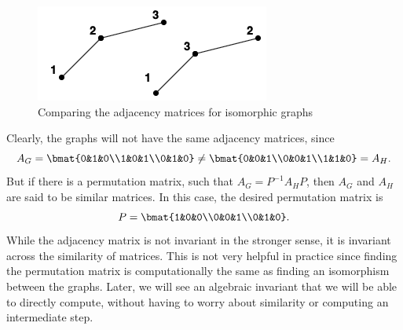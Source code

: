 \documentclass{article}
\begin{document}
\noindent 
\begin{figure}[H]
\centering
\includegraphics[scale=0.5]{Images/isomorphic_graphs.png}
\caption{Comparing the adjacency matrices for isomorphic graphs}
\label{fig:my_label}
\end{figure}  

\noindent Clearly, the graphs will not have the same adjacency matrices, since $$A_G = \bmat{0&1&0\\1&0&1\\0&1&0} \neq \bmat{0&0&1\\0&0&1\\1&1&0} = A_H.$$ But if there is a permutation matrix, such that $A_G = P^{-1}A_HP$, then $A_G$ and $A_H$ are said to be similar matrices. In this case, the desired permutation matrix is $$P=\bmat{1&0&0\\0&0&1\\0&1&0}.$$ While the adjacency matrix is not invariant in the stronger sense, it is invariant across the similarity of matrices. This is not very helpful in practice since finding the permutation matrix is computationally the same as finding an isomorphism between the graphs. Later, we will see an algebraic invariant that we will be able to directly compute, without having to worry about similarity or computing an intermediate step. 
\end{document}
